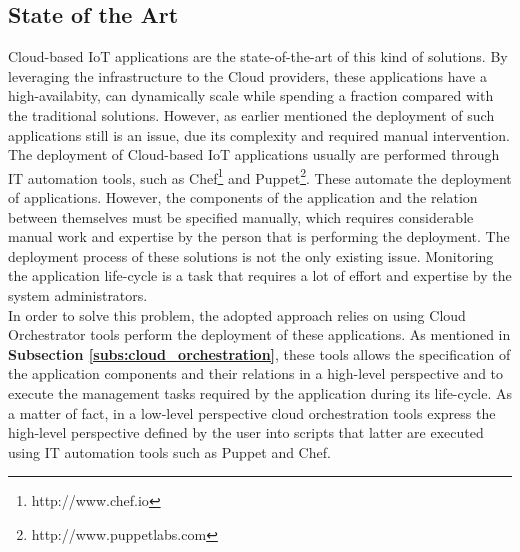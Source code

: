 \subsection{State of the Art}
\label{sub:state_of_art}
Cloud-based IoT applications are the state-of-the-art of this kind of solutions. By leveraging
the infrastructure to the Cloud providers, these applications have a high-availabity, can dynamically
scale while spending a fraction compared with the traditional solutions. However, as earlier
mentioned the deployment of such applications still is an issue, due its complexity and
required manual intervention. The deployment of Cloud-based IoT applications usually are performed
through IT automation tools, such as Chef\footnote{http://www.chef.io} and Puppet\footnote{http://www.puppetlabs.com}.
These automate the deployment of applications. However, the components of the application and the relation between
themselves must be specified manually, which requires considerable manual work and expertise by the person that
is performing the deployment. The deployment process of these solutions is not the only existing  issue.
Monitoring the application life-cycle is a task that requires a lot of effort and expertise by the system
administrators.\\

In order to solve this problem, the adopted approach relies on using Cloud Orchestrator tools perform the
deployment of these applications. As mentioned in \textbf{Subsection \ref{subs:cloud_orchestration}},
these tools allows the specification of the application components and their relations in a high-level perspective
and to execute the management tasks required by the application during its life-cycle. As a matter of fact,
in a low-level perspective cloud orchestration tools express the high-level perspective defined by the user
into scripts that latter are executed using IT automation tools such as Puppet and Chef.
